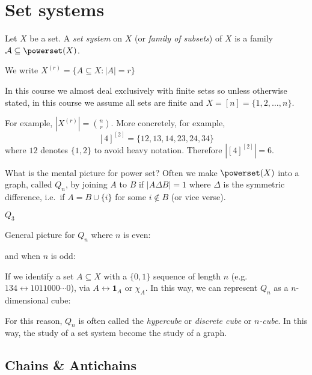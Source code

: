\documentclass[a4paper]{article}
\begin{document}


\section{Set systems}

\begin{definition}
  Let \(X\) be a set. A \emph{set system} on \(X\) (or \emph{family of subsets}) of \(X\) is a family \(\mathcal A \subseteq \powerset (X)\).
\end{definition}

\begin{eg}
  We write \(X^{(r)} = \{A \subseteq X: |A| = r\}\)
\end{eg}

In this course we almost deal exclusively with finite setss so unless otherwise stated, in this course we assume all sets are finite and \(X = [n] = \{1, 2, \dots, n\}\).

For example, \(|X^{(r)}| = \binom{n}{r}\). More concretely, for example,
\[
  [4]^{[2]} = \{12, 13, 14, 23, 24, 34\}
\]
where \(12\) denotes \(\{1, 2\}\) to avoid heavy notation. Therefore \(|[4]^{[2]}| = 6\).

What is the mental picture for power set? Often we make \(\powerset (X)\) into a graph, called \(Q_n\), by joining \(A\) to \(B\) if \(|A \Delta B| = 1\) where \(\Delta\) is the symmetric difference, i.e.\ if \(A = B \cup \{i\}\) for some \(i \notin B\) (or vice verse).

\begin{eg}
  \(Q_3\)
\end{eg}

\begin{eg}
  General picture for \(Q_n\) where \(n\) is even:

  and when \(n\) is odd:
\end{eg}

If we identify a set \(A \subseteq X\) with a \(\{0, 1\}\) sequence of length \(n\) (e.g.\ \(134 \leftrightarrow 1011000 \cdots 0\)), via \(A \leftrightarrow \mathbf{1}_A \text{ or } \chi_A\). In this way, we can represent \(Q_n\) as a \(n\)-dimensional cube:

For this reason, \(Q_n\) is often called the \emph{hypercube} or \emph{discrete cube} or \emph{\(n\)-cube}. In this way, the study of a set system become the study of a graph.

\subsection{Chains \& Antichains}
\end{document}
